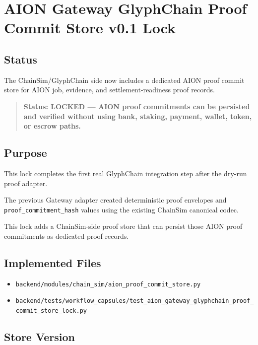 \section{AION Gateway GlyphChain Proof Commit Store v0.1 Lock}
\label{sec:aion-gateway-glyphchain-proof-commit-store-lock}

\subsection{Status}

The ChainSim/GlyphChain side now includes a dedicated AION proof commit store for AION job, evidence, and settlement-readiness proof records.

\begin{quote}
\textbf{Status: LOCKED --- AION proof commitments can be persisted and verified without using bank, staking, payment, wallet, token, or escrow paths.}
\end{quote}

\subsection{Purpose}

This lock completes the first real GlyphChain integration step after the dry-run proof adapter.

The previous Gateway adapter created deterministic proof envelopes and \texttt{proof\_commitment\_hash} values using the existing ChainSim canonical codec.

This lock adds a ChainSim-side proof store that can persist those AION proof commitments as dedicated proof records.

\subsection{Implemented Files}

\begin{itemize}
  \item \texttt{backend/modules/chain\_sim/aion\_proof\_commit\_store.py}
  \item \texttt{backend/tests/workflow\_capsules/test\_aion\_gateway\_glyphchain\_proof\_commit\_store\_lock.py}
\end{itemize}

\subsection{Store Version}

